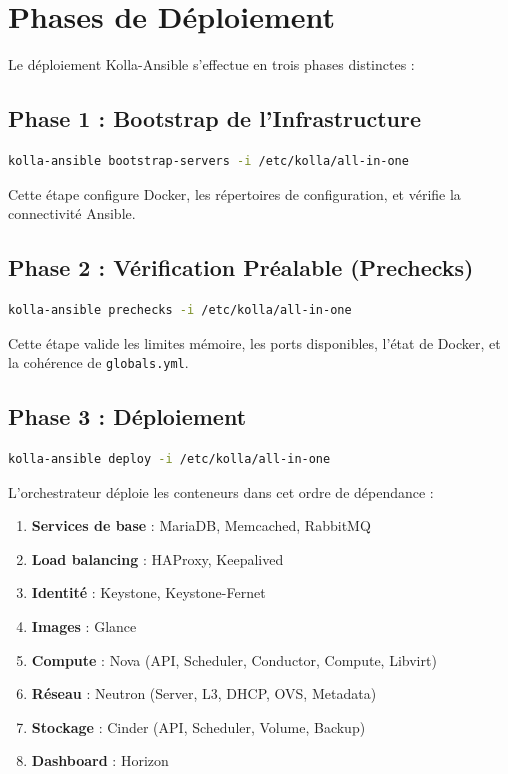 \documentclass[12pt,a4paper,oneside]{book}
\begin{document}
\section{Phases de D\'eploiement}

Le d\'eploiement Kolla-Ansible s'effectue en trois phases distinctes :

\subsection{Phase 1 : Bootstrap de l'Infrastructure}
\begin{lstlisting}[language=bash, caption={Bootstrap des serveurs}]
kolla-ansible bootstrap-servers -i /etc/kolla/all-in-one
\end{lstlisting}
Cette \'etape configure Docker, les r\'epertoires de configuration, et v\'erifie la connectivit\'e Ansible.

\subsection{Phase 2 : V\'erification Pr\'ealable (Prechecks)}
\begin{lstlisting}[language=bash, caption={V\'erification des pr\'e-requis}]
kolla-ansible prechecks -i /etc/kolla/all-in-one
\end{lstlisting}
Cette \'etape valide les limites m\'emoire, les ports disponibles, l'\'etat de Docker, et la coh\'erence de \texttt{globals.yml}.

\subsection{Phase 3 : D\'eploiement}
\begin{lstlisting}[language=bash, caption={D\'eploiement complet}]
kolla-ansible deploy -i /etc/kolla/all-in-one
\end{lstlisting}

L'orchestrateur d\'eploie les conteneurs dans cet ordre de d\'ependance :
\begin{enumerate}
    \item \textbf{Services de base} : MariaDB, Memcached, RabbitMQ
    \item \textbf{Load balancing} : HAProxy, Keepalived
    \item \textbf{Identit\'e} : Keystone, Keystone-Fernet
    \item \textbf{Images} : Glance
    \item \textbf{Compute} : Nova (API, Scheduler, Conductor, Compute, Libvirt)
    \item \textbf{R\'eseau} : Neutron (Server, L3, DHCP, OVS, Metadata)
    \item \textbf{Stockage} : Cinder (API, Scheduler, Volume, Backup)
    \item \textbf{Dashboard} : Horizon
\end{enumerate}
\end{document}
